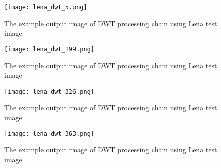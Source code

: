 \begin{figure}[!htb]
    \centering
    \texttt{[image: lena\_dwt\_5.png]}
    \caption{The example output image of DWT processing chain using Lena test image \cite{lena}}
    \label{fig:lena_dwt_5}
\end{figure}

\begin{figure}[!htb]
    \centering
    \texttt{[image: lena\_dwt\_199.png]}
    \caption{The example output image of DWT processing chain using Lena test image \cite{lena}}
    \label{fig:lena_dwt_199}
\end{figure}

\begin{figure}[!htb]
    \centering
    \texttt{[image: lena\_dwt\_326.png]}
    \caption{The example output image of DWT processing chain using Lena test image \cite{lena}}
    \label{fig:lena_dwt_326}
\end{figure}

\begin{figure}[!htb]
    \centering
    \texttt{[image: lena\_dwt\_363.png]}
    \caption{The example output image of DWT processing chain using Lena test image \cite{lena}}
    \label{fig:lena_dwt_363}
\end{figure}
